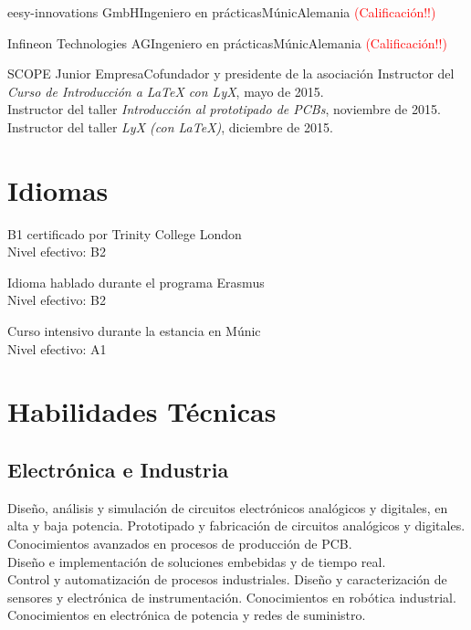 \documentclass[11pt,a4paper,sans,spanish]{moderncv}
\begin{document}
{eesy-innovations GmbH}{Ingeniero en prácticas}{Múnic}{Alemania}
{\textcolor{red}{(Calificación!!)}}

{Infineon Technologies AG}{Ingeniero en prácticas}{Múnic}{Alemania}
{\textcolor{red}{(Calificación!!)}}

{SCOPE Junior Empresa}{Cofundador y presidente de la asociación}{}{}
{Instructor del \emph{Curso de Introducción a LaTeX con LyX}, mayo de 2015.\\
Instructor del taller \emph{Introducción al prototipado de PCBs}, noviembre de 2015.\\
Instructor del taller \emph{LyX (con LaTeX)}, diciembre de 2015.}


\section{Idiomas}


{B1 certificado por Trinity College London\\Nivel efectivo: B2}

{Idioma hablado durante el programa Erasmus\\Nivel efectivo: B2}

{Curso intensivo durante la estancia en Múnic\\Nivel efectivo: A1} 

\section{Habilidades Técnicas}

\subsection{Electrónica e Industria}
Diseño, análisis y simulación de circuitos electrónicos analógicos y digitales, en alta y baja potencia. 
Prototipado y fabricación de circuitos analógicos y digitales. Conocimientos avanzados en procesos de producción de PCB.
\protect\\[0.3em]
Diseño e implementación de soluciones embebidas y de tiempo real.
\protect\\[0.3em]
Control y automatización de procesos industriales.
Diseño y caracterización de sensores y electrónica de instrumentación. Conocimientos en robótica industrial.
\protect\\[0.3em]
Conocimientos en electrónica de potencia y redes de suministro.
\end{document}

